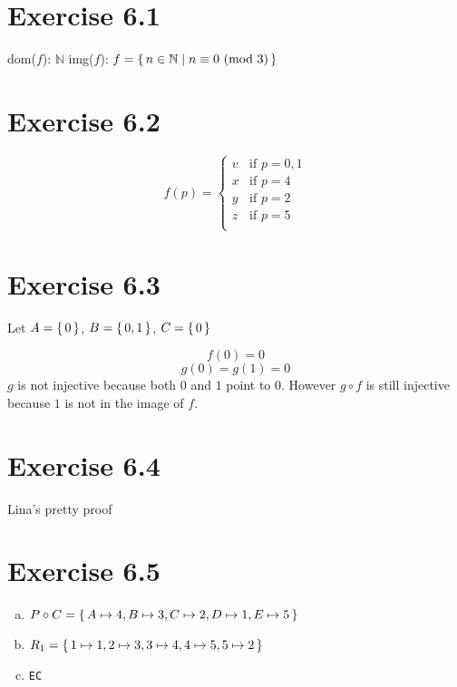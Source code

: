 \documentclass{article} %
\newcommand{\homeworkNumber}{6}
\begin{document}
\section*{Exercise \homeworkNumber.1}

dom($f$): $\mathbb{N}$\newline
img($f$): $f = \set{n \in \mathbb{N} \mid n \equiv 0 \text{ (mod 3)}}$


\section*{Exercise \homeworkNumber.2}

\begin{equation}
f(p) = \begin{cases}
		v & \text{if } p = 0,1\\
		x & \text{if } p = 4\\
		y & \text{if } p = 2\\
		z & \text{if } p = 5\\
	\end{cases}
\end{equation}

\section*{Exercise \homeworkNumber.3}

Let $A = \set{0}$, $B = \set{0, 1}$, $C = \set{0}$

\begin{equation}
f(0) = 0
\end{equation}
\begin{equation}
g(0) = g(1) = 0
\end{equation}
\noindent
$g$ is not injective because both $0$ and $1$ point to $0$. However $g \circ f$ is still injective because $1$ is not in the image of $f$.



\section*{Exercise \homeworkNumber.4}

Lina's pretty proof

\section*{Exercise \homeworkNumber.5}

\begin{enumerate}[a)]

\item $ P \circ C = \set{A \mapsto 4, B \mapsto 3, C \mapsto 2, D \mapsto 1, E \mapsto 5}$

\item $ R_1 = \set{1 \mapsto 1, 2 \mapsto 3, 3 \mapsto 4, 4 \mapsto 5, 5 \mapsto 2} $

\item \verb|EC|



\end{enumerate}
\end{document}
